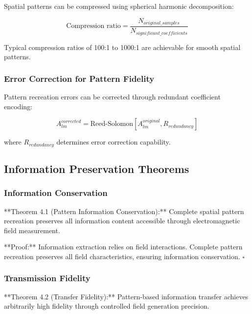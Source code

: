 \documentclass[12pt,a4paper]{article}
\begin{document}
Spatial patterns can be compressed using spherical harmonic decomposition:

\begin{equation}
\text{Compression ratio} = \frac{N_{original\_samples}}{N_{significant\_coefficients}}
\label{eq:pattern_compression}
\end{equation}

Typical compression ratios of 100:1 to 1000:1 are achievable for smooth spatial patterns.

\subsubsection{Error Correction for Pattern Fidelity}

Pattern recreation errors can be corrected through redundant coefficient encoding:

\begin{equation}
A_{lm}^{corrected} = \text{Reed-Solomon}[A_{lm}^{original}, R_{redundancy}]
\label{eq:pattern_error_correction}
\end{equation}

where $R_{redundancy}$ determines error correction capability.

\subsection{Information Preservation Theorems}

\subsubsection{Information Conservation}

**Theorem 4.1 (Pattern Information Conservation):** Complete spatial pattern recreation preserves all information content accessible through electromagnetic field measurement.

**Proof:** Information extraction relies on field interactions. Complete pattern recreation preserves all field characteristics, ensuring information conservation. $\square$

\subsubsection{Transmission Fidelity}

**Theorem 4.2 (Transfer Fidelity):** Pattern-based information transfer achieves arbitrarily high fidelity through controlled field generation precision.
\end{document}
